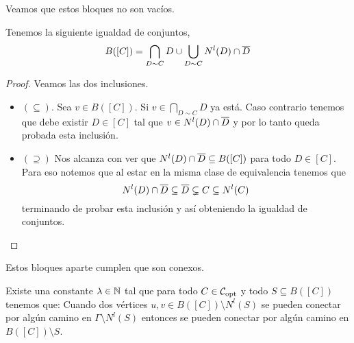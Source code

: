 \documentclass[tesis.tex]{subfiles}
\begin{document}
\begin{center}
\end{center}

Veamos que estos bloques no son vacíos.

\begin{lema}
	Tenemos la siguiente igualdad de conjuntos,
	\[
		B([C]) = \bigcap_{D \sim C} D \cup \bigcup_{D \sim C} N^l(D) \cap \overline D
	\]
\end{lema}

\begin{proof}
	Veamos las dos inclusiones.
	
	\begin{itemize}
		\item \textbf{$(\subseteq)$}. 
		Sea $v \in B([C])$. 
		Si $v \in \bigcap_{D \sim C} D$ ya está. 
		Caso contrario tenemos que debe existir $D \in [C]$ tal que $v \in N^l(D) \cap \overline D$ y por lo tanto queda probada esta inclusión.
		\item \textbf{$(\supseteq)$} 
		Nos alcanza con ver que $ N^l(D) \cap \overline D \subseteq B([C])$ para todo $D \in [C]$.
		Para eso notemos que al estar en la misma clase de equivalencia tenemos que 
		\[
			N^l(D) \cap \overline D \subseteq \overline D \subsetneq C \subseteq N^l(C)
		\]
		terminando de probar esta inclusión y así obteniendo la igualdad de conjuntos.
	\end{itemize}
\end{proof}

Estos bloques aparte cumplen que son conexos.

\begin{lema}\label{lema_conexion_B(C)}
	Existe una constante $\lambda \in \mathbb{N}$ tal que para todo $C \in {\cal C}_{\text{opt}}$ y todo $S \subseteq B([C])$ tenemos que: 
	Cuando dos vértices $u,v \in B([C]) \setminus N^l(S)$ se pueden conectar por algún camino en $\Gamma \setminus N^l(S)$ entonces se pueden conectar por algún camino en $B([C]) \setminus S$. 
\end{lema}
\end{document}
